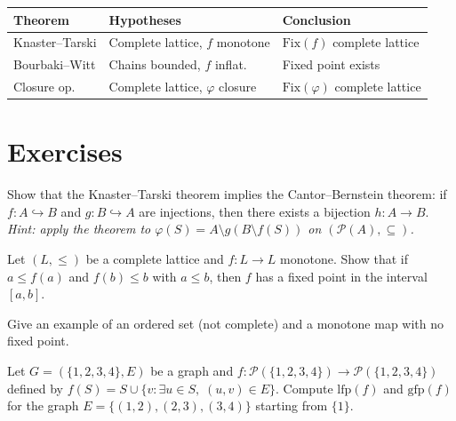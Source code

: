 \begin{keyformulas}[title=\textbf{Fixed points in ordered sets}]
\begin{center}
\renewcommand{\arraystretch}{1.3}
\begin{tabular}{|l|l|l|}
\hline
\textbf{Theorem} & \textbf{Hypotheses} & \textbf{Conclusion} \\
\hline
Knaster--Tarski & Complete lattice, $f$ monotone & $\mathrm{Fix}(f)$ complete lattice \\
Bourbaki--Witt & Chains bounded, $f$ inflat. & Fixed point exists \\
Closure op. & Complete lattice, $\varphi$ closure & $\mathrm{Fix}(\varphi)$ complete lattice \\
\hline
\end{tabular}
\end{center}
\end{keyformulas}

\section{Exercises}

\begin{exercise}
Show that the Knaster--Tarski theorem implies the Cantor--Bernstein theorem: if
$f\colon A \hookrightarrow B$ and $g\colon B \hookrightarrow A$ are injections, then
there exists a bijection $h\colon A \to B$.
\emph{Hint: apply the theorem to $\varphi(S) = A \setminus g(B \setminus f(S))$ on
$(\mathcal{P}(A), \subseteq)$.}
\end{exercise}

\begin{exercise}
Let $(L, \leq)$ be a complete lattice and $f\colon L \to L$ monotone. Show that if
$a \leq f(a)$ and $f(b) \leq b$ with $a \leq b$, then $f$ has a fixed point in the
interval $[a, b]$.
\end{exercise}

\begin{exercise}
Give an example of an ordered set (not complete) and a monotone map with no fixed point.
\end{exercise}

\begin{exercise}
Let $G = (\{1,2,3,4\}, E)$ be a graph and
$f\colon \mathcal{P}(\{1,2,3,4\}) \to \mathcal{P}(\{1,2,3,4\})$ defined by
$f(S) = S \cup \{v : \exists u \in S, \; (u,v) \in E\}$. Compute $\mathrm{lfp}(f)$ and
$\mathrm{gfp}(f)$ for the graph $E = \{(1,2), (2,3), (3,4)\}$ starting from $\{1\}$.
\end{exercise}

